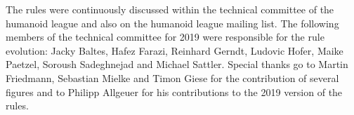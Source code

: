 The rules were continuously discussed within the technical committee of the humanoid league and also on the humanoid league mailing list. The following members of the technical committee for 2019 were responsible for the rule evolution: Jacky Baltes, Hafez Farazi, Reinhard Gerndt, Ludovic Hofer, Maike Paetzel, Soroush Sadeghnejad and Michael Sattler. Special thanks go to Martin Friedmann, Sebastian Mielke and Timon Giese for the contribution of several figures and to Philipp Allgeuer for his contributions to the 2019 version of the rules.
